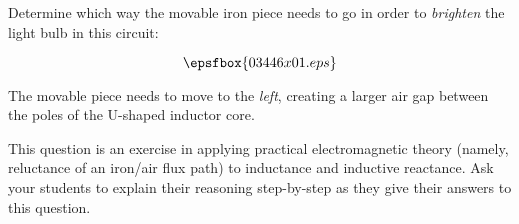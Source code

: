 

Determine which way the movable iron piece needs to go in order to {\it brighten} the light bulb in this circuit:

$$\epsfbox{03446x01.eps}$$







The movable piece needs to move to the {\it left}, creating a larger air gap between the poles of the U-shaped inductor core.







This question is an exercise in applying practical electromagnetic theory (namely, reluctance of an iron/air flux path) to inductance and inductive reactance.  Ask your students to explain their reasoning step-by-step as they give their answers to this question.




